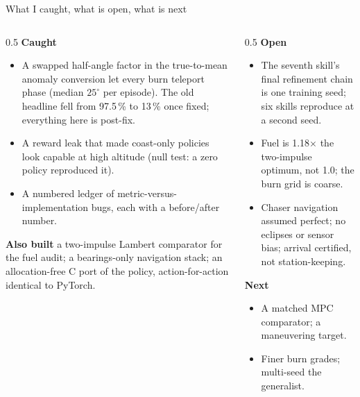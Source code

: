 \documentclass[aspectratio=169,11pt]{beamer}
\begin{document}
\begin{frame}{What I caught, what is open, what is next}
\begin{columns}[T]
\begin{column}{0.5\textwidth}\footnotesize
\textbf{Caught}
\begin{itemize}
  \item A swapped half-angle factor in the true-to-mean anomaly conversion let every burn teleport phase (median $25^\circ$ per episode). The old headline fell from 97.5\,\% to 13\,\% once fixed; everything here is post-fix.
  \item A reward leak that made coast-only policies look capable at high altitude (null test: a zero policy reproduced it).
  \item A numbered ledger of metric-versus-implementation bugs, each with a before/after number.
\end{itemize}
\textbf{Also built} \; a two-impulse Lambert comparator for the fuel audit; a bearings-only navigation stack; an allocation-free C port of the policy, action-for-action identical to PyTorch.
\end{column}
\begin{column}{0.5\textwidth}\footnotesize
\textbf{Open}
\begin{itemize}
  \item The seventh skill's final refinement chain is one training seed; six skills reproduce at a second seed.
  \item Fuel is 1.18$\times$ the two-impulse optimum, not 1.0; the burn grid is coarse.
  \item Chaser navigation assumed perfect; no eclipses or sensor bias; arrival certified, not station-keeping.
\end{itemize}
\textbf{Next}
\begin{itemize}
  \item A matched MPC comparator; a maneuvering target.
  \item Finer burn grades; multi-seed the generalist.
\end{itemize}
\end{column}
\end{columns}
\end{frame}
\end{document}
